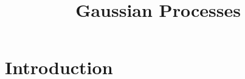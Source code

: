 \documentclass{article}
\title{Gaussian Processes}
\begin{document}
\maketitle

\section{Introduction}
\cite{GaussProc_SimpleIntro}

\printbibliography
\end{document}
